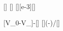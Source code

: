 [\volt]
[\volt]
[\milli\ampere][e-3][\ampere]

[V_0-V_]{\VzX-\VLX}[\volt]
[]{(\VzX-\VLX)/\IX}[\ohm]
